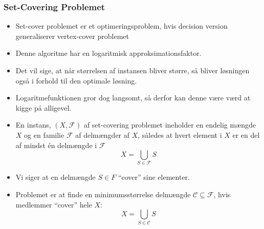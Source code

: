 \begin{frame}[allowframebreaks]
	\frametitle{Set-Covering Problemet}
	\begin{itemize}
		\item Set-cover problemet er et optimeringsproblem, hvis decision version generaliserer vertex-cover problemet
		\item Denne algoritme har en logaritmisk approksimationsfaktor.
		\item Det vil sige, at når størrelsen af instansen bliver større, så bliver løsningen også i forhold til den optimale løsning.
		\item Logaritmefunktionen gror dog langsomt, så derfor kan denne være værd at kigge på alligevel.
		\item En instans, $(X, \mathcal{F})$ af set-covering problemet ineholder en endelig mængde $X$ og en familie $\mathcal{F}$ af delmængder af $X$, således at hvert element i $X$ er en del af mindst én delmængde i $\mathcal{F}$
		      \begin{equation*}
			      X = \bigcup_{S \in \mathcal{F}} S
		      \end{equation*}
		\item Vi siger at en delmængde $S \in F$ ``cover'' sine elementer.
		\item Problemet er at finde en minimumsstørrelse delmængde $\mathcal{C} \subseteq \mathcal{F}$, hvis medlemmer ``cover'' hele $X$:
		      \begin{equation*}
			      X = \bigcup_{S \in \mathcal{C}} S
		      \end{equation*}
	\end{itemize}
\end{frame}



